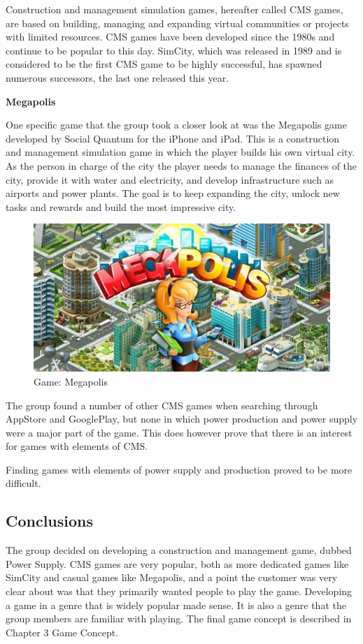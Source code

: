 Construction and management simulation games, hereafter called CMS games, are based on building, managing and expanding virtual communities or projects with limited resources. CMS games have been developed since the 1980s and continue to be popular to this day. SimCity, which was released in 1989 and is considered to be the first CMS game to be highly successful, has spawned numerous successors, the last one released this year. \cite{wikiCMS}

{\bf Megapolis}

One specific game that the group took a closer look at was the Megapolis game developed by Social Quantum for the iPhone and iPad. This is a construction and management simulation game in which the player builds his own virtual city. As the person in charge of the city the player needs to manage the finances of the city, provide it with water and electricity, and develop infrastructure such as airports and power plants. The goal is to keep expanding the city, unlock new tasks and rewards and build the most impressive city. \cite{megapolis}

\begin{figure}[H]
	\centering
	\includegraphics[width=\textwidth]{pictures/megapolis.jpg}
	\caption{Game: Megapolis}
\end{figure}

The group found a number of other CMS games when searching through AppStore and GooglePlay, but none in which power production and power supply were a major part of the game. This does however prove that there is an interest for games
with elements of CMS.

Finding games with elements of power supply and production proved to be more difficult.

\subsection{Conclusions}

The group decided on developing a construction and management game, dubbed Power Supply. CMS games are very popular, both as more dedicated games like SimCity and casual games like Megapolis, and a point the customer was very clear about was that they primarily wanted people to play the game. Developing a game in a genre that is widely popular made sense. It is also a genre that the group members are familiar with playing. The final game concept is described in Chapter 3 Game Concept.
